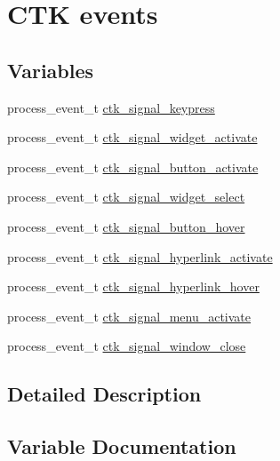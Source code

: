 \hypertarget{group__ctkevents}{}\section{C\+T\+K events}
\label{group__ctkevents}
\subsection*{Variables}
\begin{DoxyCompactItemize}
\item 
process\+\_\+event\+\_\+t \hyperlink{group__ctkevents_ga516fdcf33758900be278d0e448635b9d}{ctk\+\_\+signal\+\_\+keypress}
\item 
process\+\_\+event\+\_\+t \hyperlink{group__ctkevents_gaf2f104ce01e5e229f9eba8e2f367c591}{ctk\+\_\+signal\+\_\+widget\+\_\+activate}
\item 
process\+\_\+event\+\_\+t \hyperlink{group__ctkevents_ga73b4f7cc9f9fd72c23ea9b24b3492e01}{ctk\+\_\+signal\+\_\+button\+\_\+activate}
\item 
process\+\_\+event\+\_\+t \hyperlink{group__ctkevents_ga84a8111d8df809f10e8ad81bc47edc3a}{ctk\+\_\+signal\+\_\+widget\+\_\+select}
\item 
process\+\_\+event\+\_\+t \hyperlink{group__ctkevents_ga18b0bcdb7d4ba13f8f692ffd8d54a690}{ctk\+\_\+signal\+\_\+button\+\_\+hover}
\item 
process\+\_\+event\+\_\+t \hyperlink{group__ctkevents_gab927db233b2469345094ba7b9e1c769a}{ctk\+\_\+signal\+\_\+hyperlink\+\_\+activate}
\item 
process\+\_\+event\+\_\+t \hyperlink{group__ctkevents_ga9e08a17ead01c3ae4ac4e96b40cae885}{ctk\+\_\+signal\+\_\+hyperlink\+\_\+hover}
\item 
process\+\_\+event\+\_\+t \hyperlink{group__ctkevents_gaa56be046241082d23581812190f2bef5}{ctk\+\_\+signal\+\_\+menu\+\_\+activate}
\item 
process\+\_\+event\+\_\+t \hyperlink{group__ctkevents_gab92e76646299dbab7216ab1f9dcef9e5}{ctk\+\_\+signal\+\_\+window\+\_\+close}
\end{DoxyCompactItemize}


\subsection{Detailed Description}


\subsection{Variable Documentation}
\hypertarget{group__ctkevents_ga73b4f7cc9f9fd72c23ea9b24b3492e01}{}
